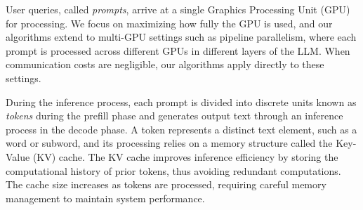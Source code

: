 User queries, called \textit{prompts}, arrive at a single Graphics Processing Unit (GPU) for processing. We focus on maximizing how fully the GPU is used, and our algorithms extend to multi-GPU settings such as pipeline parallelism, where each prompt is processed across different GPUs in different layers of the LLM. When communication costs are negligible, our algorithms apply directly to these settings. 

During the inference process, each prompt is divided into discrete units known as \textit{tokens} during the prefill phase and generates output text through an inference process in the decode phase. A token represents a distinct text element, such as a word or subword, and its processing relies on a memory structure called the Key-Value (KV) cache. The KV cache improves inference efficiency by storing the computational history of prior tokens, thus avoiding redundant computations. The cache size increases as tokens are processed, requiring careful memory management to maintain system performance.





